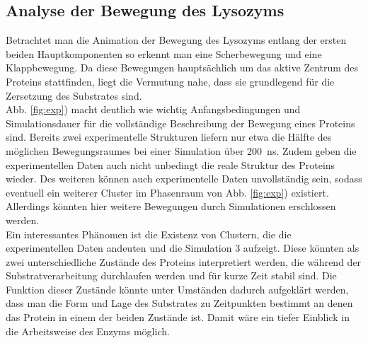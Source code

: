 \subsection{Analyse der Bewegung des Lysozyms}
Betrachtet man die Animation der Bewegung des Lysozyms entlang der ersten beiden Hauptkomponenten so erkennt man eine Scherbewegung und eine Klappbewegung.
Da diese Bewegungen hauptsächlich um das aktive Zentrum des Proteins stattfinden, liegt die Vermutung nahe, dass sie grundlegend für die Zersetzung des Substrates sind.
\\ \noindent
Abb. \ref{fig:exp}) macht deutlich wie wichtig Anfangsbedingungen und Simulationsdauer für die vollständige Beschreibung der Bewegung eines Proteins sind.
Bereits zwei experimentelle Strukturen liefern nur etwa die Hälfte des möglichen Bewegungsraumes bei einer Simulation über 200~ns.
Zudem geben die experimentellen Daten auch nicht unbedingt die reale Struktur des Proteins wieder.
Des weiteren können auch experimentelle Daten unvollständig sein, sodass eventuell ein weiterer Cluster im Phasenraum von Abb. \ref{fig:exp}) existiert.
Allerdings könnten hier weitere Bewegungen durch Simulationen erschlossen werden.
\\ \noindent
Ein interessantes Phänomen ist die Existenz von Clustern, die die experimentellen Daten andeuten und die Simulation 3 aufzeigt.
Diese könnten als zwei unterschiedliche Zustände des Proteins interpretiert werden, die während der Substratverarbeitung durchlaufen werden und für kurze Zeit stabil sind.
Die Funktion dieser Zustände könnte unter Umständen dadurch aufgeklärt werden, dass man die Form und Lage des Substrates zu Zeitpunkten bestimmt an denen das Protein in einem der beiden Zustände ist.
Damit wäre ein tiefer Einblick in die Arbeitsweise des Enzyms möglich.
